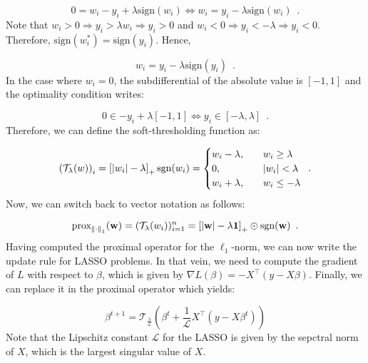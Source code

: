 \documentclass[a4paper,10pt]{article}
\theoremstyle{definition}
\begin{document}
\begin{equation*}
    0 = w_i - y_i + \lambda \text{sign}(w_i)
    \iff w_i = y_i - \lambda \text{sign}(w_i)
    \enspace .
\end{equation*}
%
Note that $w_i > 0 \Rightarrow y_i > \lambda w_i \Rightarrow y_i > 0$ and
$w_i < 0 \Rightarrow y_i < -\lambda \Rightarrow y_i < 0$. Therefore, $\text{sign}(w_i^*) = \text{sign}(y_i)$.
Hence,

\begin{equation*}
    w_i = y_i - \lambda \text{sign}(y_i)
    \enspace .
\end{equation*}
%
In the case where $w_i = 0$, the subdifferential of the absolute value is $[-1, 1]$
and the optimality condition writes:

\begin{equation*}
    0 \in -y_i + \lambda [-1, 1]
    \iff y_i \in [-\lambda, \lambda]
    \enspace .
\end{equation*}
%
Therefore, we can define the soft-thresholding function as:

\begin{equation*}
    \left(\mathcal{T}_{\lambda}(w)\right)_i = \left[\lvert w_i \rvert - \lambda\right]_+ \text{sgn}(w_i)
    =
    \begin{cases}
        w_i - \lambda,  \quad & w_i \geq \lambda    \\
        0, \quad              & \lvert w_i \rvert < \lambda \\
        w_i + \lambda, \quad  & w_i \leq -\lambda
    \end{cases}
    \enspace .
\end{equation*}
%
Now, we can switch back to vector notation as follows:

\begin{equation*}
    \text{prox}_{\left \lVert \cdot \right \rVert_1}(\mathbf{w}) = (\mathcal{T}_{\lambda}(w_i))_{i=1}^n
    = \left[\lvert \mathbf{w} \rvert - \lambda \mathbf{1}\right]_+ \odot \text{sgn}(\mathbf{w})
    \enspace .
\end{equation*}
%
Having computed the proximal operator for the $\ell_1$-norm, we can now write the update
rule for LASSO problems. In that vein, we need to compute the gradient of $L$ with respect
to $\beta$, which is given by $\nabla L(\beta) = -X^{\top}(y-X\beta)$. Finally, we can replace
it in the proximal operator which yields:

\begin{equation*}
    \beta^{t+1} = \mathcal{T}_{\frac{\lambda}{\mathcal{L}}}\left(
    \beta^{t} + \frac{1}{\mathcal{L}} X^{\top}(y-X\beta^t)
    \right)
\end{equation*}
%
Note that the Lipschitz constant $\mathcal{L}$ for the LASSO is given by the sepctral norm
of $X$, which is the largest singular value of $X$.
\end{document}

